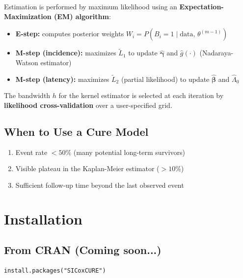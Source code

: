 \documentclass[12pt,a4paper]{article}
\begin{document}
Estimation is performed by maximum likelihood using an
\textbf{Expectation-Maximization (EM) algorithm}:
\begin{itemize}
  \item \textbf{E-step:} computes posterior weights
    $W_i = P(B_i = 1 \mid \text{data},\, \theta^{(m-1)})$
  \item \textbf{M-step (incidence):} maximizes $\tilde{L}_1$
    to update $\hat{\boldsymbol{\gamma}}$ and
    $\hat{g}(\cdot)$ (Nadaraya-Watson estimator)
  \item \textbf{M-step (latency):} maximizes $\tilde{L}_2$
    (partial likelihood) to update $\hat{\boldsymbol{\beta}}$
    and $\hat{\Lambda}_0$
\end{itemize}

The bandwidth $h$ for the kernel estimator is selected at each
iteration by \textbf{likelihood cross-validation}
over a user-specified grid.

\subsection{When to Use a Cure Model}

\begin{infobox}
\begin{enumerate}
  \item Event rate $< 50\%$ (many potential long-term survivors)
  \item Visible plateau in the Kaplan-Meier estimator ($> 10\%$)
  \item Sufficient follow-up time beyond the last observed event
\end{enumerate}
\end{infobox}

\section{Installation}

\subsection{From CRAN (Coming soon...)}

\begin{lstlisting}[style=Rcode, caption={Installation from CRAN}]
install.packages("SICoxCURE")
\end{lstlisting}
\end{document}
